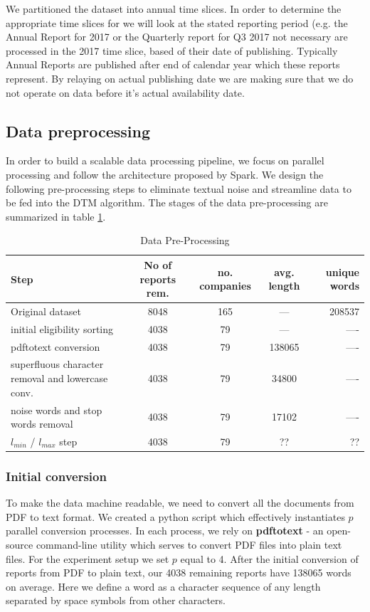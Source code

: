 \documentclass[12pt,journal,letterpaper,oneside,onecolumn]{IEEEtran}
\begin{document}
We partitioned the dataset into annual time slices. In order to determine the appropriate time slices for we will look at the stated reporting period (e.g. the Annual Report for 2017 or the Quarterly report for Q3 2017 not necessary are processed in the 2017 time slice, based of their date of publishing. Typically Annual Reports are published after end of calendar year which these reports represent. By relaying on actual publishing date we are making sure that we do not operate on data before it's actual availability date.
\subsection{Data preprocessing}
In order to build a scalable data processing pipeline, we focus on parallel processing and follow the architecture proposed by Spark\cite{ref_finnum_spark}. We design the following pre-processing steps to eliminate textual noise and streamline data to be fed into the DTM algorithm. The stages of the data pre-processing are summarized in table \ref{tab:pre-process-steps}. 

\begin{table}[!ht]
  \begin{center}
    \caption{Data Pre-Processing}
    \label{tab:pre-process-steps}
    \begin{tabular}{l|c|c|c|r}
      \textbf{Step} & \textbf{No of reports rem.} & \textbf{no. companies} & \textbf{avg. length} & \textbf{unique words}\\
      \hline
      Original dataset & 8048 & 165 & --- &  208537 \\
      initial eligibility sorting & 4038 & 79 & --- & ---- \\
      pdftotext conversion & 4038 & 79 & 138065 & ---- \\
      superfluous character removal and lowercase conv. & 4038 & 79 & 34800 & ---- \\
      noise words and stop words removal & 4038 & 79 & 17102 & ---- \\
      $l_{min}$ / $l_{max}$ step & 4038 & 79 & ?? & ?? \\
    \end{tabular}
  \end{center}
\end{table}



\subsubsection{Initial conversion}
To make the data machine readable, we need to convert all the documents from PDF to text format. We created a python script which effectively instantiates $p$ parallel conversion processes. In each process, we rely on \textbf{pdftotext} - an open-source command-line utility which serves to convert PDF files into plain text files. For the experiment setup we set $p$ equal to 4. After the initial conversion of reports from PDF to plain text, our 4038 remaining reports have 138065 words on average. Here we define a word as a character sequence of any length separated by space symbols from other characters.
\end{document}
